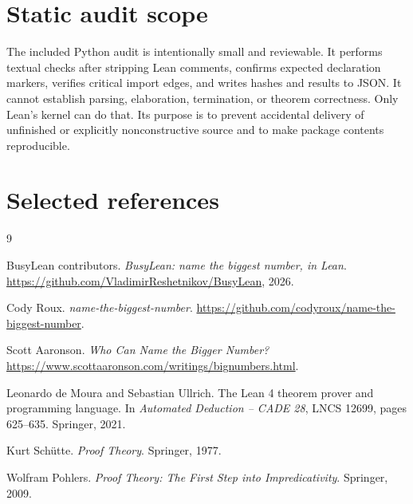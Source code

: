 \documentclass[11pt]{article}
\theoremstyle{definition}
\theoremstyle{remark}
\begin{document}
\section{Static audit scope}

The included Python audit is intentionally small and reviewable. It performs
textual checks after stripping Lean comments, confirms expected declaration
markers, verifies critical import edges, and writes hashes and results to JSON.
It cannot establish parsing, elaboration, termination, or theorem correctness.
Only Lean's kernel can do that. Its purpose is to prevent accidental delivery
of unfinished or explicitly nonconstructive source and to make package contents
reproducible.

\section{Selected references}

\begin{thebibliography}{9}

BusyLean contributors.
\newblock \emph{BusyLean: name the biggest number, in Lean}.
\newblock \url{https://github.com/VladimirReshetnikov/BusyLean}, 2026.

Cody Roux.
\newblock \emph{name-the-biggest-number}.
\newblock \url{https://github.com/codyroux/name-the-biggest-number}.

Scott Aaronson.
\newblock \emph{Who Can Name the Bigger Number?}
\newblock \url{https://www.scottaaronson.com/writings/bignumbers.html}.

Leonardo de Moura and Sebastian Ullrich.
\newblock The Lean 4 theorem prover and programming language.
\newblock In \emph{Automated Deduction -- CADE 28}, LNCS 12699,
  pages 625--635. Springer, 2021.

Kurt Sch\"utte.
\newblock \emph{Proof Theory}.
\newblock Springer, 1977.

Wolfram Pohlers.
\newblock \emph{Proof Theory: The First Step into Impredicativity}.
\newblock Springer, 2009.

\end{thebibliography}
\end{document}
